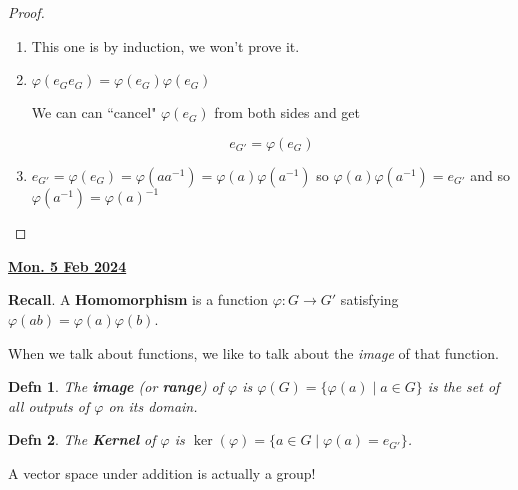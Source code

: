 \documentclass[12pt]{article}
\renewcommand{\date}[1]{\underline{\bf #1}}
\def\phi{\varphi}
\newtheorem{definition}{Defn}
\theoremstyle{remark}
\theoremstyle{remark}
\theoremstyle{remark}
\theoremstyle{remark}
\theoremstyle{remark}
\begin{document}
\begin{proof}
  \begin{enumerate}
    \item This one is by induction, we won't prove it.
    \item $\varphi(e_{G} e_{G}) = \varphi(e_G) \varphi(e_G)$

          We can can ``cancel" $\varphi(e_G)$ from both sides and get

          \[
            e_{G'} = \varphi(e_G)
          \]

    \item $e_{G'} = \varphi(e_G) = \varphi(a a^{-1}) = \varphi(a) \varphi(a^{-1})$
          so $\varphi(a)\varphi(a^{-1}) = e_{G'}$ and so $\varphi(a^{-1}) =
            \varphi(a)^{-1}$
  \end{enumerate}
\end{proof}

\date{Mon. 5 Feb 2024}

{\bf Recall}. A {\bf Homomorphism} is a function $\phi: G \to G'$ satisfying
$\phi(ab) = \phi(a)\phi(b)$.

When we talk about functions, we like to talk about the {\it image} of that
function.

\begin{definition}
  The {\bf image} (or {\bf range}) of $\phi$ is $\phi(G) = \{\phi(a) \mid a \in
  G \}$ is the set of all outputs of $\phi$ on its domain.
\end{definition}

\begin{definition}
	The {\bf Kernel} of $\phi$ is $\ker(\phi) = \{a \in G \mid \phi(a) = e_{G'} \}$.
\end{definition}

A vector space under addition is actually a group!
\end{document}
